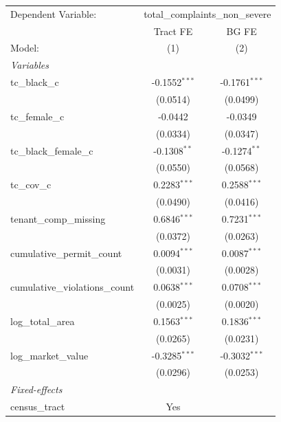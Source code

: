 \begin{tabular}{lcc}
   \tabularnewline \midrule \midrule
   Dependent Variable: & \multicolumn{2}{c}{total\_complaints\_non\_severe}\\
                                   & Tract FE        & BG FE \\   
   Model:                          & (1)             & (2)\\  
   \midrule
   \emph{Variables}\\
   tc\_black\_c                    & -0.1552$^{***}$ & -0.1761$^{***}$\\   
                                   & (0.0514)        & (0.0499)\\   
   tc\_female\_c                   & -0.0442         & -0.0349\\   
                                   & (0.0334)        & (0.0347)\\   
   tc\_black\_female\_c            & -0.1308$^{**}$  & -0.1274$^{**}$\\   
                                   & (0.0550)        & (0.0568)\\   
   tc\_cov\_c                      & 0.2283$^{***}$  & 0.2588$^{***}$\\   
                                   & (0.0490)        & (0.0416)\\   
   tenant\_comp\_missing           & 0.6846$^{***}$  & 0.7231$^{***}$\\   
                                   & (0.0372)        & (0.0263)\\   
   cumulative\_permit\_count       & 0.0094$^{***}$  & 0.0087$^{***}$\\   
                                   & (0.0031)        & (0.0028)\\   
   cumulative\_violations\_count   & 0.0638$^{***}$  & 0.0708$^{***}$\\   
                                   & (0.0025)        & (0.0020)\\   
   log\_total\_area                & 0.1563$^{***}$  & 0.1836$^{***}$\\   
                                   & (0.0265)        & (0.0231)\\   
   log\_market\_value              & -0.3285$^{***}$ & -0.3032$^{***}$\\   
                                   & (0.0296)        & (0.0253)\\   
   \midrule
   \emph{Fixed-effects}\\
   census\_tract                   & Yes             & \\  

\end{tabular}
